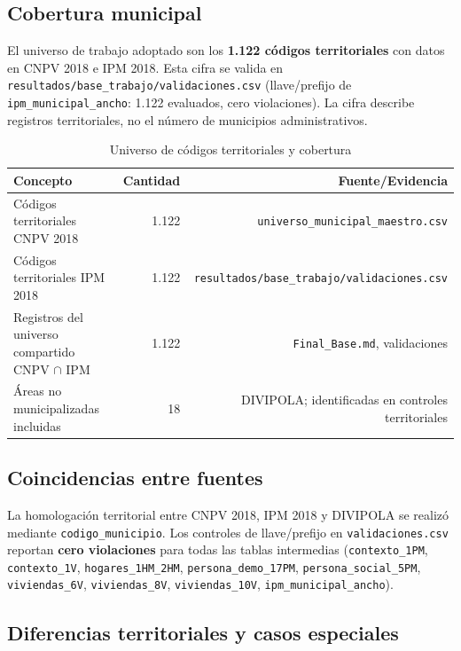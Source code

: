 \subsection{Cobertura municipal}
\label{sec:cobertura_municipal}

El universo de trabajo adoptado son los \textbf{1.122 códigos territoriales} con datos en CNPV 2018 e IPM 2018. Esta cifra se valida en \texttt{resultados/base\_trabajo/validaciones.csv} (llave/prefijo de \texttt{ipm\_municipal\_ancho}: 1.122 evaluados, cero violaciones). La cifra describe registros territoriales, no el número de municipios administrativos.

\begin{table}[htbp]
\centering
\caption{Universo de códigos territoriales y cobertura}
\label{tab:universo_municipal}
\begin{tabular}{@{}lrr@{}}
\toprule
\textbf{Concepto} & \textbf{Cantidad} & \textbf{Fuente/Evidencia} \\
\midrule
Códigos territoriales CNPV 2018 & 1.122 & \texttt{universo\_municipal\_maestro.csv} \\
Códigos territoriales IPM 2018 & 1.122 & \texttt{resultados/base\_trabajo/validaciones.csv} \\
Registros del universo compartido CNPV $\cap$ IPM & 1.122 & \texttt{Final\_Base.md}, validaciones \\
Áreas no municipalizadas incluidas & 18 & DIVIPOLA; identificadas en controles territoriales \\
\bottomrule
\end{tabular}
\end{table}

\subsection{Coincidencias entre fuentes}
\label{sec:coincidencias}

La homologación territorial entre CNPV 2018, IPM 2018 y DIVIPOLA se realizó mediante \texttt{codigo\_municipio}. Los controles de llave/prefijo en \texttt{validaciones.csv} reportan \textbf{cero violaciones} para todas las tablas intermedias (\texttt{contexto\_1PM}, \texttt{contexto\_1V}, \texttt{hogares\_1HM\_2HM}, \texttt{persona\_demo\_17PM}, \texttt{persona\_social\_5PM}, \texttt{viviendas\_6V}, \texttt{viviendas\_8V}, \texttt{viviendas\_10V}, \texttt{ipm\_municipal\_ancho}).

\subsection{Diferencias territoriales y casos especiales}
\label{sec:no_coincidencias}

